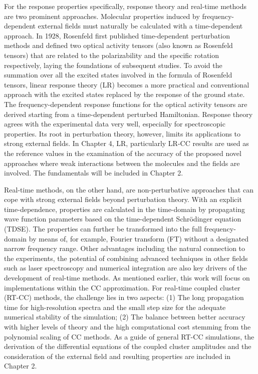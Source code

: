 For the response properties specifically, response theory and real-time methods are two prominent approaches. Molecular properties induced by frequency-dependent external fields must naturally be calculated with a time-dependent approach. In 1928, Rosenfeld first published time-dependent perturbation methods and defined two optical activity tensors (also known as Rosenfeld tensors) that are related to the polarizability and the specific rotation respectively, laying the foundations of subsequent studies.\cite{Rosenfeld1929} To avoid the summation over all the excited states involved in the formula of Rosenfeld tensors, linear response theory (LR)\cite{Olsen1985, Sekino1984} becomes a more practical and conventional approach with the excited states replaced by the response of the ground state. The frequency-dependent response functions for the optical activity tensors are derived starting from a time-dependent perturbed Hamiltonian. Response theory agrees with the experimental data very well, especially for spectroscopic properties.\cite{Kobayashi1994, Roos1996, Coriani2012} Its root in perturbation theory, however, limits its applications to strong external fields. In Chapter 4, LR, particularly LR-CC results are used as the reference values in the examination of the accuracy of the proposed novel approaches where weak interactions between the molecules and the fields are involved. The fundamentals will be included in Chapter 2. 

Real-time methods, on the other hand, are non-perturbative approaches that can cope with strong external fields beyond perturbation theory.\cite{Goings2018, Li2020} With an explicit time-dependence, properties are calculated in the time-domain by propagating wave function parameters based on the time-dependent Schr\"odinger equation (TDSE). The properties can further be transformed into the full frequency-domain by means of, for example, Fourier transform (FT) without a designated narrow frequency range. Other advantages including the natural connection to the experiments, the potential of combining advanced techniques in other fields such as laser spectroscopy and numerical integration are also key drivers of the development of real-time methods. As mentioned earlier, this work will focus on implementations within the CC approximation. For real-time coupled cluster (RT-CC) methods, the challenge lies in two aspects: (1) The long propagation time for high-resolution spectra and the small step size for the adequate numerical stability of the simulation; (2) The balance between better accuracy with higher levels of theory and the high computational cost stemming from the polynomial scaling of CC methods. As a guide of general RT-CC simulations, the derivation of the differential equations of the coupled cluster amplitudes and the consideration of the external field and resulting properties are included in Chapter 2. 

